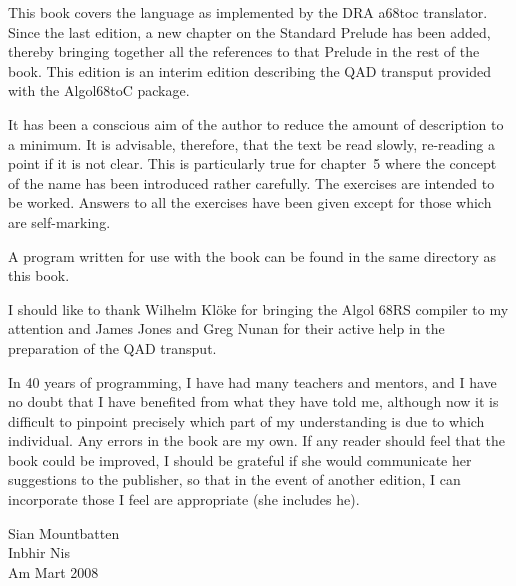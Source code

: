 This book covers the language as implemented by the DRA a68toc
translator.  Since the last edition, a new chapter on the Standard
Prelude has been added, thereby bringing together all the references
to that Prelude in the rest of the book. This edition is an interim
edition describing the QAD transput provided with the Algol68toC package.

It has been a conscious aim of the author to reduce the amount of
description to a minimum.  It is advisable, therefore, that the text be
read slowly, re-reading a point if it is not clear.  This is
particularly true for chapter~5 where the concept of the name has been
introduced rather carefully. The exercises are intended to be worked. 
Answers to all the exercises have been given except for those which are
self-marking.

A program written for use with the book can be found in the same
directory as this book.

I should like to thank Wilhelm Kl\"oke for bringing the Algol 68RS
compiler to my attention and James Jones and Greg Nunan for their
active help in the preparation of the QAD transput.

In 40 years of programming, I have had many teachers and mentors, and I
have no doubt that I have benefited from what they have told me,
although now it is difficult to pinpoint precisely which part of my
understanding is due to which individual. Any errors in the book are my
own.  If any reader should feel that the book could be improved, I
should be grateful if she would communicate her suggestions to the
publisher, so that in the event of another edition, I can incorporate
those I feel are appropriate (she includes he).
\bigskip\bigskip
\begin{flushright}
Sian Mountbatten\\
Inbhir Nis\\
Am Mart 2008
\end{flushright}
